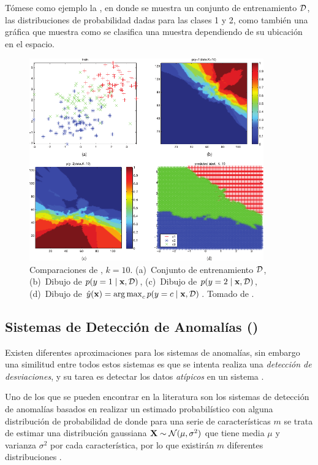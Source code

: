 Tómese como ejemplo la , en donde se muestra un conjunto de entrenamiento $\mathcal{D}$, las distribuciones de probabilidad dadas para las clases 1 y 2, como también una gráfica que muestra como se clasifica una muestra dependiendo de su ubicación en el espacio.

\begin{figure}[H]
   \centering
   \includegraphics[width=0.9\textwidth]{Figures/knn-comparisons.pdf}
   \decoRule
   \caption[Comparaciones de \textsl{}]{Comparaciones de \textsl{}, $k=10$. (a)~Conjunto de entrenamiento $\mathcal{D}$, (b)~Dibujo de $p(y=1 \mid {\mathbf{x}}, \mathcal{D})$, (c)~Dibujo de $p(y=2 \mid {\mathbf{x}}, \mathcal{D})$, (d)~Dibujo de $\hat{y}({\mathbf{x}}) = \operatorname*{arg\,max}_{c} p(y=c \mid {\mathbf{x}}, \mathcal{D})$. Tomado de \cite{murphymachinel}.}
   \label{fig:knn-comparisons}
\end{figure}


\subsection{Sistemas de Detección de Anomalías ()}
Existen diferentes aproximaciones para los sistemas de anomalías, sin embargo una similitud entre todos estos sistemas es que se intenta realiza una \emph{detección de desviaciones}, y su tarea es detectar los datos \emph{atípicos} en un sistema \cite{tan2005introduction}.

Uno de los que se pueden encontrar en la literatura son los sistemas de detección de anomalías basados en realizar un estimado probabilístico con alguna distribución de probabilidad de donde para una serie de características $m$ se trata de estimar una distribución gaussiana ${\mathbf{X}} \sim \mathcal{N}(\mu, \sigma^2)$ que tiene media $\mu$ y varianza $\sigma^2$ por cada característica, por lo que existirán $m$ diferentes distribuciones .

